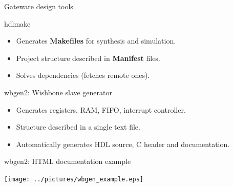 \documentclass[compress,red]{beamer}
\begin{document}
\begin{frame}{Gateware design tools}

  \pause
  \begin{block}{hdlmake}
    \begin{itemize}
    \item Generates \textbf{Makefiles} for synthesis and simulation.
    \item Project structure described in \textbf{Manifest} files.
    \item Solves dependencies (fetches remote ones).
    \end{itemize}
  \end{block}

  \pause
  \begin{block}{wbgen2: Wishbone slave generator}
    \begin{itemize}
    \item Generates registers, RAM, FIFO, interrupt controller.
    \item Structure described in a single text file.
    \item Automatically generates HDL source, C header and documentation.
    \end{itemize}
  \end{block}

  \note[item]{}

\end{frame}

\begin{frame}{wbgen2: HTML documentation example}

  \begin{center}
    \texttt{[image: ../pictures/wbgen\_example.eps]}
  \end{center}


\end{frame}
\end{document}
